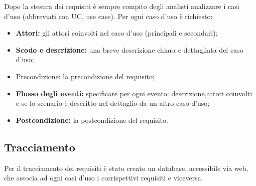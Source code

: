 Dopo la stesura dei requisiti è sempre compito degli analisti analizzare i casi d'uso (abbreviati con UC, use case).
Per ogni caso d'uso è richiesto:
\begin{itemize}
	\item \textbf{Attori:} gli attori coinvolti nel caso d'uso (principali e secondari);
	\item \textbf{Scodo e descrizione:} una breve descrizione chiara e dettagliata del caso d'uso;
	\item Precondizione: la precondizione del requisito;
	\item \textbf{Flusso degli eventi:} specificare per ogni evento: descrizione,attori coinvolti e se lo scenario è descritto nel dettaglio da un altro caso d'uso;
	\item \textbf{Postcondizione:} la postcondizione del requisito.
\end{itemize}

\subsection{Tracciamento}
Per il tracciamento dei requisiti è stato creato un database, accessibile via web, che associa ad ogni casi d'uso i corrispettivi requisiti e viceversa.